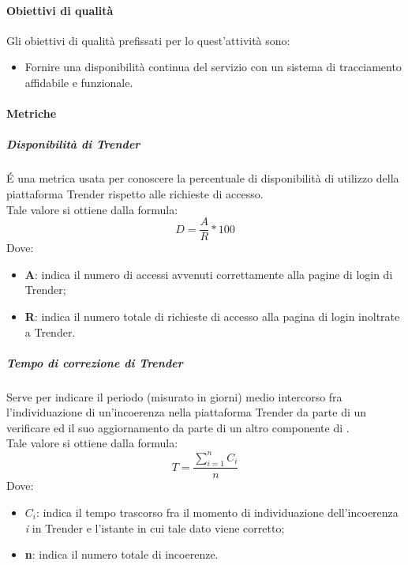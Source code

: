 \documentclass[../NormeDiProgetto_v3.0.0.tex]{subfiles}
\begin{document}
			\paragraph{Obiettivi di qualità}
				Gli obiettivi di qualità prefissati per lo quest'attività sono:
				\begin{itemize}
					\item Fornire una disponibilità continua del servizio con un sistema di tracciamento affidabile e funzionale.
				\end{itemize}
			\paragraph{Metriche}
			\subparagraph{Disponibilità di Trender}
				É una metrica usata per conoscere la percentuale di disponibilità di utilizzo della piattaforma Trender rispetto alle richieste di accesso.\\Tale valore si ottiene dalla formula:
				\begin{equation*}
					D = \frac{A}{R} * 100
				\end{equation*}
				Dove:
				\begin{itemize}
					\item \textbf{A}: indica il numero di accessi avvenuti correttamente alla pagine di login di Trender;
					\item \textbf{R}: indica il numero totale di richieste di accesso alla pagina di login inoltrate a Trender.
				\end{itemize}
				
			\subparagraph{Tempo di correzione di Trender}
				Serve per indicare il periodo (misurato in giorni) medio intercorso fra l'individuazione di un'incoerenza nella piattaforma Trender da parte di un verificare ed il suo aggiornamento da parte di un altro componente di \kpanic.\\Tale valore si ottiene dalla formula:
				\begin{equation*}
					T =\frac{\sum_{i=1}^n C_{i}}{n}
				\end{equation*}
				Dove:
				\begin{itemize}
					\item \textbf{$C_{i}$}: indica il tempo trascorso fra il momento di individuazione dell'incoerenza \textit{i} in Trender e l'istante in cui tale dato viene corretto;
					\item \textbf{n}: indica il numero totale di incoerenze.
				\end{itemize}
\end{document}
